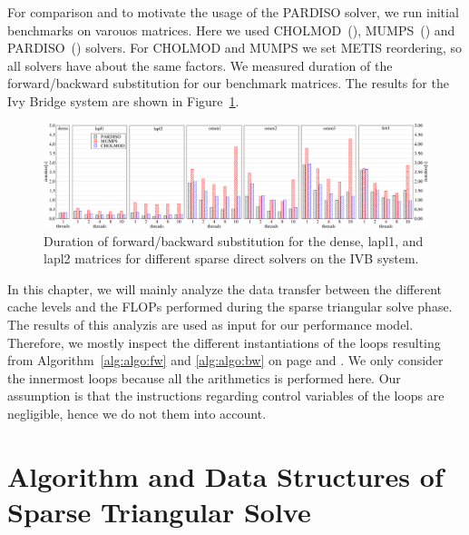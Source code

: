 For comparison and to motivate the usage of the PARDISO solver, we run initial benchmarks on varouos matrices. Here we used CHOLMOD~(\cite{cholmod2008,doi:10.1137/1.9780898718881}), MUMPS~(\cite{amestoy-2000,amestoy-2001,amestoy-2006}) and PARDISO~(\cite{schenk-2004,kuzmin-2013}) solvers. For CHOLMOD and MUMPS we set METIS reordering, so all solvers have about the same factors. We measured duration of the forward/backward substitution for our benchmark
matrices. The results for the Ivy Bridge system are shown in Figure~\ref{fig:solvers}.

%
\begin{figure}[tp]
  \centering
	\includegraphics[width=\textwidth,clip=true]{images/SolverComparison}
   \caption{Duration of forward/backward substitution for the dense, lapl1, and lapl2 matrices for different sparse direct solvers on the IVB system.}
  \label{fig:solvers}
\end{figure}

In this chapter, we will mainly analyze the data transfer between the different cache levels and the FLOPs performed during the sparse triangular solve phase. The results of this analyzis are used as input for our performance model. Therefore, we mostly inspect the different instantiations of the loops resulting from Algorithm~\ref{alg:algo:fw} and \ref{alg:algo:bw} on page \pageref{alg:algo:fw} and \pageref{alg:algo:bw}. We only consider the innermost loops because all the arithmetics is performed here. Our assumption is that the instructions regarding control variables of the loops are negligible, hence we do not them into account.

\section{Algorithm and Data Structures of Sparse Triangular Solve}

